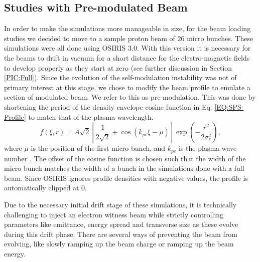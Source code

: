 

\subsection{Studies with Pre-modulated Beam}
\label{Sim:PBPreMod}

In order to make the simulations more manageable in size, for the beam loading studies we decided to move to a sample proton beam of $26$ micro bunches. These simulations were all done using OSIRIS 3.0. With this version it is necessary for the beams to drift in vacuum for a short distance for the electro-magnetic fields to develop properly as they start at zero (see further discussion in Section \ref{PIC:Full}). Since the evolution of the self-modulation instability was not of primary interest at this stage, we chose to modify the beam profile to emulate a section of modulated beam. We refer to this as pre-modulation. This was done by shortening the period of the density envelope cosine function in Eq. \ref{EQ:SPS-Profile} to match that of the plasma wavelength.
\begin{equation}
    f(\xi,r) = A\sqrt{2} \left[\frac{1}{2\sqrt{2}} + \cos\left(k_{pe}\xi - \mu\right)\right] \exp\left(-\frac{r^{2}}{2\sigma_{r}^{2}}\right), \label{EQ:PB-PreMod}
\end{equation}
where $\mu$ is the position of the first micro bunch, and $k_{pe}$ is the plasma wave number \cite{berglyd_olsen:2015}. The offset of the cosine function is chosen such that the width of the micro bunch matches the width of a bunch in the simulations done with a full beam. Since OSIRIS ignores profile densities with negative values, the profile is automatically clipped at $0$.


Due to the necessary initial drift stage of these simulations, it is technically challenging to inject an electron witness beam while strictly controlling parameters like emittance, energy spread and transverse size as these evolve during this drift phase. There are several ways of preventing the beam from evolving, like slowly ramping up the beam charge or ramping up the beam energy. 


